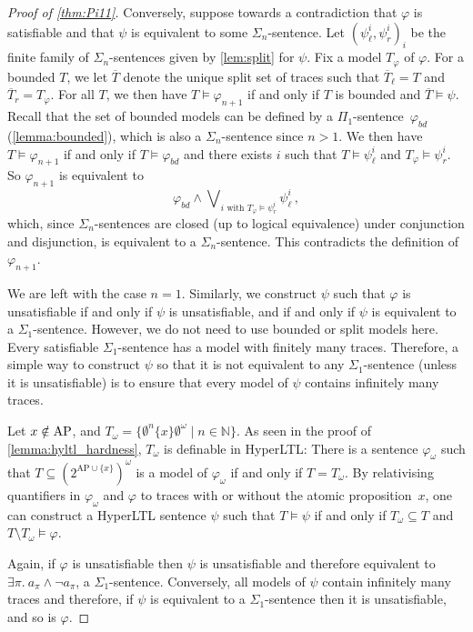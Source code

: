 \documentclass[dvipsnames,10pt,a4paper]{amsart}
\theoremstyle{definition}
\theoremstyle{remark}
\newcommand{\set}[1]{\{#1\}}
\newcommand{\nats}{\mathbb{N}}
\newcommand\Nat{\nats}
\newcommand{\pow}[1]{2^{#1}}
\newcommand{\hyltl}{{HyperLTL}\xspace}
\newcommand{\ap}[0]{\mathrm{AP}}
\newcommand\AP{\textup{AP}}
\newcommand\Tl{T_\ell}
\newcommand\Tr {T_r}
\newcommand\phib{\varphi_{\mathit{bd}}}
\begin{document}
\begin{proof}[Proof of \autoref{thm:Pi11}]
  Conversely, suppose towards a contradiction that $\varphi$ is satisfiable
  and that $\psi$ is equivalent to some $\Sigma_n$-sentence.
  Let $(\psi^i_\ell,\psi^i_r)_{i}$ be the finite family of $\Sigma_n$-sentences given
  by \autoref{lem:split} for $\psi$.
  Fix a model $T_\varphi$ of $\varphi$.
  For a bounded $T$, we let $\overline T$ denote the unique split set of traces such that
  $\overline \Tl = T$ and $\overline \Tr  = T_\varphi$.
  For all $T$, we then have $T \models \varphi_{n+1}$ if and only if $T$ is
  bounded and $\overline T \models \psi$.
  Recall that the set of bounded models can be defined by a
  $\Pi_1$-sentence~$\phib$ (\autoref{lemma:bounded}), which is also
  a $\Sigma_n$-sentence since $n > 1$.
  We then have $T \models \varphi_{n+1}$ if and only if $T \models \phib$ and
  there exists $i$ such that $T \models \psi^i_\ell$ and
  $T_\varphi \models \psi^i_r$.
  So $\varphi_{n+1}$ is equivalent to
  \[
    \phib \land \bigvee\nolimits_{i \text{ with } T_{\varphi} \models \psi^i_r}  \psi^i_\ell \, ,
  \]
  which, since $\Sigma_n$-sentences are closed (up to logical equivalence)
  under conjunction and disjunction, is equivalent to a $\Sigma_n$-sentence.
  This contradicts the definition of $\varphi_{n+1}$.

  \smallskip

  We are left with the case $n = 1$.
  Similarly, we construct $\psi$ such that $\varphi$ is unsatisfiable
  if and only if $\psi$ is unsatisfiable, and if and only if
  $\psi$ is equivalent to a $\Sigma_1$-sentence.
  However, we do not need to use bounded or split models here.
  Every satisfiable $\Sigma_1$-sentence has a model with finitely
  many traces.
  Therefore, a simple way to construct $\psi$ so that it is not equivalent to any
  $\Sigma_1$-sentence (unless it is unsatisfiable) is to ensure that every model
  of $\psi$ contains infinitely many traces.

  Let $x \notin \AP$, and
  $T_\omega = \{ \emptyset^n \{x\} \emptyset^\omega \mid n \in \Nat \}$.
  As seen in the proof of \autoref{lemma:hyltl_hardness},
  $T_\omega$ is definable in \hyltl:  There is a sentence
  $\varphi_\omega$ such that $T\subseteq (\pow{\ap \cup\set{x}})^\omega$ is a model of  $\varphi_\omega$ if and only if
  $T = T_\omega$.
  By relativising quantifiers in $\varphi_\omega$ and $\varphi$ to traces
  with or without the atomic proposition~$x$, one can construct a \hyltl
  sentence $\psi$ such that $T \models \psi$ if and only if
  $T_\omega \subseteq T$ and $T \setminus T_\omega \models \varphi$.

  Again, if $\varphi$ is unsatisfiable then $\psi$ is unsatisfiable and
  therefore equivalent to $\exists \pi.\ a_\pi \land \lnot a_\pi$,
  a $\Sigma_1$-sentence.
  Conversely, all models of $\psi$ contain infinitely many traces and therefore,
  if $\psi$ is equivalent to a $\Sigma_1$-sentence then it is unsatisfiable,
  and so is $\varphi$.
\end{proof}
\end{document}
